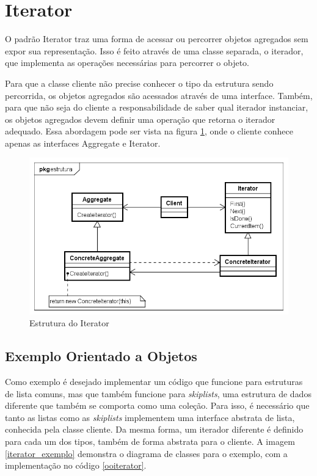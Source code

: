 \section{Iterator}

O padrão Iterator traz uma forma de acessar ou 
percorrer objetos agregados sem expor sua representação. 
Isso é feito através de uma classe separada, o iterador, 
que implementa as operações necessárias para percorrer 
o objeto. 

Para que a classe cliente não precise conhecer o tipo 
da estrutura sendo percorrida, os objetos agregados 
são acessados através de uma interface. Também, para 
que não seja do cliente a responsabilidade de saber 
qual iterador instanciar, os objetos agregados devem 
definir uma operação que retorna o iterador adequado. 
Essa abordagem pode ser vista na figura \ref{iterator_struct}, 
onde o cliente conhece apenas as interfaces 
Aggregate e Iterator.

\begin{figure}[htb]
	\caption{\label{iterator_struct}Estrutura do Iterator}
	\begin{center}
	    \includegraphics[scale=0.5]{5_padroes-contexto-funcional/5.3_comportamentais/5.3.04_iterator/iterator_struct.png}
	\end{center}
\end{figure}

\subsection*{Exemplo Orientado a Objetos}

Como exemplo é desejado implementar um código 
que funcione para estruturas de lista comuns, mas 
que também funcione para \textit{skiplists}, uma 
estrutura de dados diferente que também se comporta 
como uma coleção. Para isso, é necessário que 
tanto as listas como as \textit{skiplists} implementem 
uma interface abstrata de lista, conhecida pela 
classe cliente. Da mesma forma, um iterador diferente 
é definido para cada um dos tipos, também de forma 
abstrata para o cliente. A imagem \ref{iterator_exemplo} 
demonstra o diagrama de classes para o exemplo, com a 
implementação no código \ref{ooiterator}.

